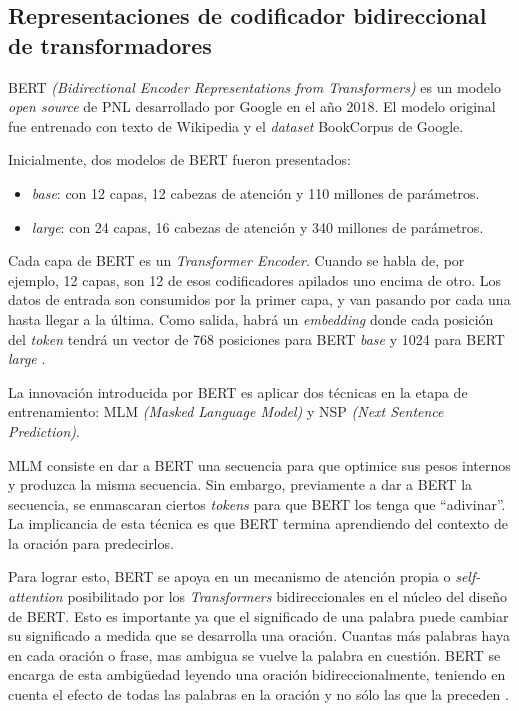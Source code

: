 \subsection{Representaciones de codificador bidireccional de transformadores}

BERT \textit{(Bidirectional Encoder Representations from Transformers)} es un modelo \textit{open source} de PNL desarrollado por Google en el año 2018. El modelo original fue entrenado con texto de Wikipedia y el \textit{dataset} BookCorpus de Google.

Inicialmente, dos modelos de BERT fueron presentados:
\begin{itemize}
	\item \textit{base}: con 12 capas, 12 cabezas de atención y 110 millones de parámetros.
	\item \textit{large}: con 24 capas, 16 cabezas de atención y 340 millones de parámetros.
\end{itemize}

Cada capa de BERT es un \textit{Transformer Encoder}. Cuando se habla de, por ejemplo, 12 capas, son 12 de esos codificadores apilados uno encima de otro. Los datos de entrada son consumidos por la primer capa, y van pasando por cada una hasta llegar a la última. Como salida, habrá un \textit{embedding} donde cada posición del \textit{token} tendrá un vector de 768 posiciones para BERT \textit{base} y 1024 para BERT \textit{large} \citep{WEBSITE:20}.

La innovación introducida por BERT es aplicar dos técnicas en la etapa de entrenamiento: MLM \textit{(Masked Language Model)} y NSP \textit{(Next Sentence Prediction)}. 

MLM consiste en dar a BERT una secuencia para que optimice sus pesos internos y produzca la misma secuencia. Sin embargo, previamente a dar a BERT la secuencia, se enmascaran ciertos \textit{tokens} para que BERT los tenga que ``adivinar''. La implicancia de esta técnica es que BERT termina aprendiendo del contexto de la oración para predecirlos.

Para lograr esto, BERT se apoya en un mecanismo de atención propia o \textit{self-attention} posibilitado por los \textit{Transformers} bidireccionales en el núcleo del diseño de BERT. Esto es importante ya que el significado de una palabra puede cambiar su significado a medida que se desarrolla una oración. Cuantas más palabras haya en cada oración o frase, mas ambigua se  vuelve la palabra en cuestión. BERT se encarga de esta ambigüedad leyendo una oración bidireccionalmente, teniendo en cuenta el efecto de todas las palabras en la oración y no sólo las que la preceden \citep{WEBSITE:21}.

